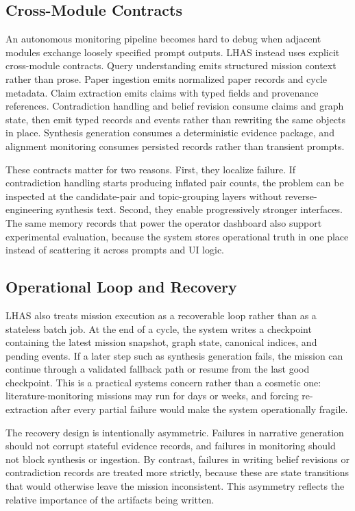\documentclass[manuscript,screen,review]{jair}
\begin{document}
\subsection{Cross-Module Contracts}
An autonomous monitoring pipeline becomes hard to debug when adjacent modules exchange loosely specified prompt outputs. LHAS instead uses explicit cross-module contracts. Query understanding emits structured mission context rather than prose. Paper ingestion emits normalized paper records and cycle metadata. Claim extraction emits claims with typed fields and provenance references. Contradiction handling and belief revision consume claims and graph state, then emit typed records and events rather than rewriting the same objects in place. Synthesis generation consumes a deterministic evidence package, and alignment monitoring consumes persisted records rather than transient prompts.

These contracts matter for two reasons. First, they localize failure. If contradiction handling starts producing inflated pair counts, the problem can be inspected at the candidate-pair and topic-grouping layers without reverse-engineering synthesis text. Second, they enable progressively stronger interfaces. The same memory records that power the operator dashboard also support experimental evaluation, because the system stores operational truth in one place instead of scattering it across prompts and UI logic.

\subsection{Operational Loop and Recovery}
LHAS also treats mission execution as a recoverable loop rather than as a stateless batch job. At the end of a cycle, the system writes a checkpoint containing the latest mission snapshot, graph state, canonical indices, and pending events. If a later step such as synthesis generation fails, the mission can continue through a validated fallback path or resume from the last good checkpoint. This is a practical systems concern rather than a cosmetic one: literature-monitoring missions may run for days or weeks, and forcing re-extraction after every partial failure would make the system operationally fragile.

The recovery design is intentionally asymmetric. Failures in narrative generation should not corrupt stateful evidence records, and failures in monitoring should not block synthesis or ingestion. By contrast, failures in writing belief revisions or contradiction records are treated more strictly, because these are state transitions that would otherwise leave the mission inconsistent. This asymmetry reflects the relative importance of the artifacts being written.
\end{document}
